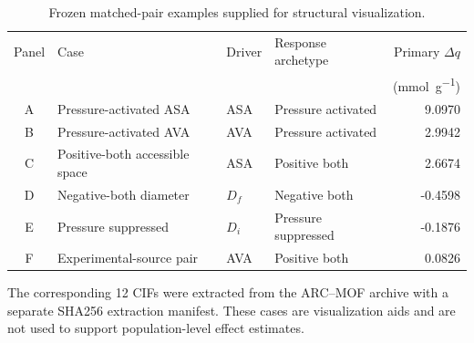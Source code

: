 \begin{table}[H]
\centering
\caption{Frozen matched-pair examples supplied for structural visualization.}
\label{tab:S29}
\begin{tabular}{clllr}
\toprule
Panel & Case & Driver & Response archetype & Primary $\Delta q$ \\
 & & & & (\si{\milli\mole\per\gram}) \\
\midrule
A & Pressure-activated ASA & ASA & Pressure activated & 9.0970 \\
B & Pressure-activated AVA & AVA & Pressure activated & 2.9942 \\
C & Positive-both accessible space & ASA & Positive both & 2.6674 \\
D & Negative-both diameter & $D_f$ & Negative both & -0.4598 \\
E & Pressure suppressed & $D_i$ & Pressure suppressed & -0.1876 \\
F & Experimental-source pair & AVA & Positive both & 0.0826 \\
\bottomrule
\end{tabular}
\end{table}

The corresponding 12 CIFs were extracted from the ARC--MOF archive with a separate
SHA256 extraction manifest. These cases are visualization aids and are not used to
support population-level effect estimates.
